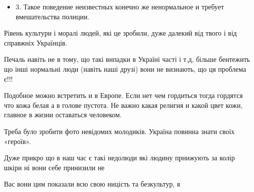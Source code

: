\begin{itemize}
\begin{itemize}
\item 3. Такое поведение неизвестных конечно же ненормальное и требует вмешательства полиции.
\end{itemize}


 

Рівень культури і моралі людей, які це зробили, дуже далекий від твого і від
справжніх Українців.


 

Печаль навіть не в тому, що такі випадки в Україні часті і т.д, більше
бентежить що інші нормальні люди (навіть наші друзі) вони не визнають, що ця
проблема є!!!

 

Подобное можно встретить и в Европе. Если нет чем гордиться тогда гордятся что
кожа белая а в голове пустота. Не важно какая религия и какой цвет кожи,
главное в жизни оставаться человеком.


 

Треба було зробити фото невідомих молодиків. Україна повинна знати своїх
«героїв».


 

Дуже прикро що в наш час є такі недолюди які людину прнижують за колір шкіри ні
вони себе принизили не

Вас вони цим показали всю свою ницість та безкультур, я



\end{itemize}
